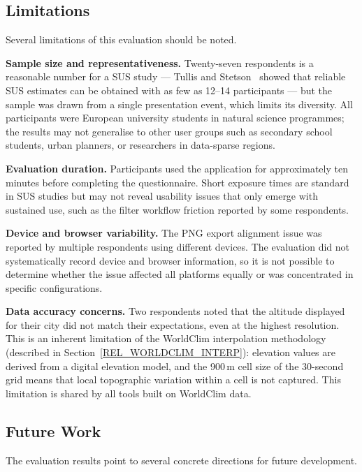 \subsection{Limitations}\label{EVAL_DISCUSS_LIMITS}

Several limitations of this evaluation should be noted.

\textbf{Sample size and representativeness.} Twenty-seven respondents is a
reasonable number for a SUS study --- Tullis and Stetson~\cite{tullis2004sus}
showed that reliable SUS estimates can be obtained with as few as 12--14
participants --- but the sample was drawn from a single presentation event,
which limits its diversity. All participants were European university students
in natural science programmes; the results may not generalise to other user
groups such as secondary school students, urban planners, or researchers in
data-sparse regions.

\textbf{Evaluation duration.} Participants used the application for
approximately ten minutes before completing the questionnaire. Short exposure
times are standard in SUS studies but may not reveal usability issues that
only emerge with sustained use, such as the filter workflow friction reported
by some respondents.

\textbf{Device and browser variability.} The PNG export alignment issue was
reported by multiple respondents using different devices. The evaluation did
not systematically record device and browser information, so it is not possible
to determine whether the issue affected all platforms equally or was
concentrated in specific configurations.

\textbf{Data accuracy concerns.} Two respondents noted that the altitude
displayed for their city did not match their expectations, even at the highest
resolution. This is an inherent limitation of the WorldClim interpolation
methodology (described in Section~\ref{REL_WORLDCLIM_INTERP}): elevation values
are derived from a digital elevation model, and the 900\,m cell size of the
30-second grid means that local topographic variation within a cell is not
captured. This limitation is shared by all tools built on WorldClim data.

\subsection{Future Work}\label{EVAL_DISCUSS_FUTURE}

The evaluation results point to several concrete directions for future
development.

